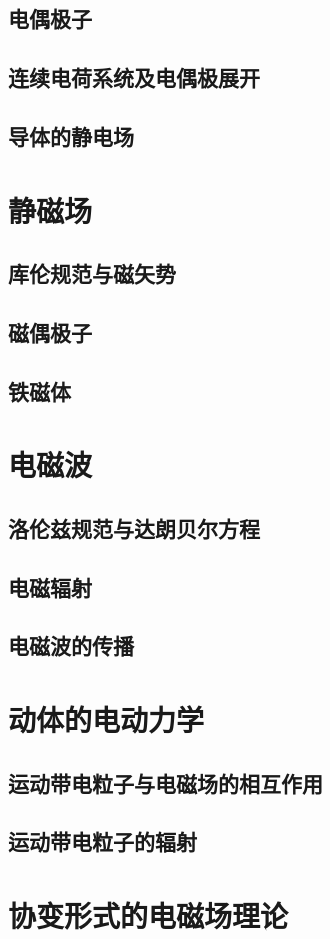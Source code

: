 \documentclass[a4paper]{report}
\begin{document}
\section{电偶极子}
\section{连续电荷系统及电偶极展开}
\section{导体的静电场}
\chapter{静磁场}
\section{库伦规范与磁矢势}
\section{磁偶极子}
\section{铁磁体}
\chapter{电磁波}
\section{洛伦兹规范与达朗贝尔方程}
\section{电磁辐射}
\section{电磁波的传播}
\chapter{动体的电动力学}
\section{运动带电粒子与电磁场的相互作用}
\section{运动带电粒子的辐射}
\chapter{协变形式的电磁场理论}
\end{document}
